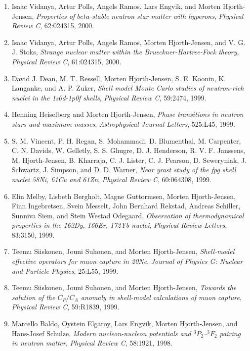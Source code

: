 \documentclass[a4wide,10pt]{article}
\begin{document}
\begin{enumerate}
\item Isaac Vidanya, Artur Polls, Angels Ramos, Lars Engvik, and Morten   Hjorth-Jensen, \emph{Properties of $beta$-stable neutron star matter with hyperons},  \emph{Physical Review C}, 62:024315, 2000. 

\item Isaac Vidanya, Artur Polls, Angels Ramos, Morten Hjorth-Jensen, and V. G. J. Stoks, \emph{Strange nuclear matter within the Brueckner-Hartree-Fock   theory},  \emph{Physical Review C}, 61:024315, 2000. 

\item David J. Dean, M. T. Ressell, Morten Hjorth-Jensen, S. E. Koonin, K. Langanke,  and A. P. Zuker, \emph{Shell model Monte Carlo studies of neutron-rich nuclei in the   1s0d-1p0f shells},  \emph{Physical Review C}, 59:2474, 1999. 

\item Henning Heiselberg and Morten Hjorth-Jensen, \emph{Phase transitions in neutron stars and maximum masses},  \emph{Astrophysical Journal Letters}, 525:L45, 1999. 

\item S. M. Vincent, P. H. Regan, S. Mohammadi, D. Blumenthal, M. Carpenter, C. N.   Davids, W. Gelletly, S. S. Ghugre, D. J. Henderson, R. V. F. Janssens,   M. Hjorth-Jensen, B. Kharraja, C. J. Lister, C. J. Pearson, D. Seweryniak,   J. Schwartz, J. Simpson, and D. D. Warner, \emph{Near yrast study of the fpg shell nuclei 58Ni,  61Cu and 61Zn},  \emph{Physical Review C}, 60:064308, 1999. 

\item Elin Melby, Lisbeth Bergholt, Magne Guttormsen, Morten Hjorth-Jensen, Finn   Ingebretsen, Svein Messelt, John Bernhard Rekstad, Andreas Schiller, Sunniva   Siem, and Stein Westad Odegaard, \emph{Observation of thermodynamical properties in the 162Dy,  166Er, 172Yb nuclei},  \emph{Physical Review Letters}, 83:3150, 1999. 

\item Teemu Siiskonen, Jouni Suhonen, and Morten Hjorth-Jensen, \emph{Shell-model effective operators for muon capture in 20Ne},  \emph{Journal of Physics G: Nuclear and Particle Physics}, 25:L55,   1999. 

\item Teemu Siiskonen, Jouni Suhonen, and Morten Hjorth-Jensen, \emph{Towards the solution of the $C_P/C_A$ anomaly in shell-model calculations of muon capture}, \emph{Physical Review C}, 59:R1839, 1999. 

\item Marcello Baldo, Oystein Elgaroy, Lars Engvik, Morten Hjorth-Jensen, and   Hans-Josef Schulze, \emph{Modern nucleon-nucleon potentials and $^3P_2$--$^3F_2$ pairing   in neutron matter},  \emph{Physical Review C}, 58:1921, 1998. 


\end{enumerate}
\end{document}
